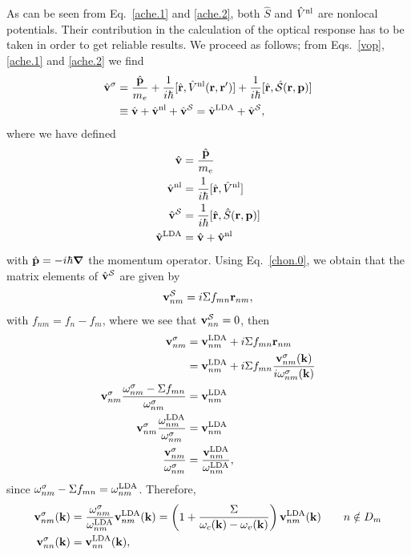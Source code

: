 \documentclass[floatfix,prb,aps,superscriptaddress,11pt,preprint,letterpaper]{revtex4}
\begin{document}
As can be seen from Eq.~\eqref{ache.1} and \eqref{ache.2},
both $\hat S$ and $\hat V^{\mathrm{nl}}$ are nonlocal potentials. Their contribution 
in the calculation of the optical response has to be taken in order to
get reliable results.\cite{ismailPRL01}
We proceed as follows; from Eqs.~\eqref{vop}, \eqref{ache.1} and
\eqref{ache.2}
 we find
\begin{align}\label{vop2}
\hat{\mathbf{v}}^\sigma&=
\frac{\hat{\mathbf{p}}}{m_e}
+
\frac{1}{i\hbar}[\hat{\mathbf{r}},\hat V^{\mathrm{nl}}(\mathbf{r},\mathbf{r}')]
+
\frac{1}{i\hbar}[\hat{\mathbf{r}},\hat{{\cal S}}(\mathbf{r},\mathbf{p})]
\nonumber\\
&\equiv
\hat{\mathbf{v}}
+
\hat{\mathbf{v}}^{\mathrm{nl}}
+\hat{\mathbf{v}}^{\cal S}
=
\hat{\mathbf{v}}^{\mathrm{LDA}}
+\hat{\mathbf{v}}^{\cal S}
,
\end{align}
where we have defined
\begin{align}\label{conhr}
\hat{\mathbf{v}}
&=\frac{\hat{\mathbf{p}}}{m_e}
\nonumber\\
\hat{\mathbf{v}}^{\mathrm{nl}}
&=
\frac{1}{i\hbar}[\hat{\mathbf{r}},\hat V^{\mathrm{nl}}]
\nonumber\\
\hat{\mathbf{v}}^{\cal S}
&=
\frac{1}{i\hbar}[\hat{\mathbf{r}},\hat S(\mathbf{r},\mathbf{p})]
\nonumber\\
\hat{\mathbf{v}}^{\mathrm{LDA}}
&=
\hat{\mathbf{v}}
+\hat{\mathbf{v}}^{\mathrm{nl}}
\end{align}  
with $\hat{\mathbf{p}}=-i\hbar\boldsymbol{\nabla}$ the momentum operator.
Using Eq.~\eqref{chon.0}, we obtain that the
matrix elements of $\hat{\mathbf{v}}^{\cal S}$ are given by
\begin{equation}\label{chon.2} 
\mathbf{v}^{\cal S}_{nm}=i\Sigma f_{mn}\mathbf{r}_{nm},
\end{equation}
with $f_{nm}=f_n-f_m$,
where we see that $\mathbf{v}^{\cal S}_{nn}=0$, then
\begin{align}\label{chon.8}
\mathbf{v}^\sigma_{nm}
&=
\mathbf{v}^{\mathrm{LDA}}_{nm}+i\Sigma f_{mn}\mathbf{r}_{nm}
\nonumber\\
&=
\mathbf{v}^{\mathrm{LDA}}_{nm}+i\Sigma f_{mn}\frac{\mathbf{v}^\sigma_{nm}(\mathbf{k})}{i\omega^\sigma_{nm}(\mathbf{k})}
\nonumber\\
\mathbf{v}^\sigma_{nm}
\frac{\omega^\sigma_{nm}-\Sigma f_{mn}}{\omega^\sigma_{nm}}
&=
\mathbf{v}^{\mathrm{LDA}}_{nm}
\nonumber\\
\mathbf{v}^\sigma_{nm}
\frac{\omega^{\mathrm{LDA}}_{nm}}{\omega^\sigma_{nm}}
&=
\mathbf{v}^{\mathrm{LDA}}_{nm}
\nonumber\\
\frac{\mathbf{v}^\sigma_{nm}}{\omega^\sigma_{nm}}
&=
\frac{\mathbf{v}^{\mathrm{LDA}}_{nm}}{\omega^{\mathrm{LDA}}_{nm}}
,
\end{align}
since
$\omega^\sigma_{nm}-\Sigma f_{mn}=\omega^{\mathrm{LDA}}_{nm}$. Therefore, 
\begin{align}\label{chon.9}
\mathbf{v}^\sigma_{nm}(\mathbf{k})
&=
\frac{\omega^\sigma_{nm}}{\omega^{\mathrm{LDA}}_{nm}}\mathbf{v}^{\mathrm{LDA}}_{nm}(\mathbf{k})
=\left(1+\frac{\Sigma}{\omega_c(\mathbf{k})-\omega_v(\mathbf{k})}\right)\mathbf{v}^{\mathrm{LDA}}_{nm}(\mathbf{k})
\quad\quad n\notin D_m
\nonumber\\
\mathbf{v}^\sigma_{nn}(\mathbf{k})
&=
\mathbf{v}^{\mathrm{LDA}}_{nn}(\mathbf{k})
,
\end{align} 
\end{document}
